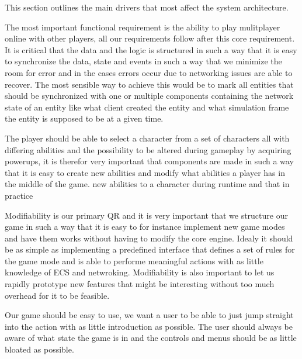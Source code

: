 	This section outlines the main drivers that most affect the system architecture.

	The most important functional requirement is the ability to play mulitplayer online with other	players, all our requirements follow after this core requirement. It is critical that the data and the logic is structured in such a way that it is easy to synchronize the data, state and events in such a way that we minimize the room for error	and in the cases errors occur due to networking issues are able to recover. The most sensible way to achieve this would be to mark all entities 	that should be synchronized with one or multiple components containing the network state of an entity like what client created the entity and what simulation	frame the entity is supposed to be at a given time.

	The player should be able to select a character from a set of characters all with differing abilities and the possibility to be altered during gameplay by acquiring powerups, it is therefor very important that components are made in such a way that it is easy to create new abilities and modify	what abilities a player has in the middle of the game. new abilities to a character during runtime and that in practice

	Modifiability is our primary QR and it is very important that we structure our game in such a way that it is easy to for instance implement new game modes and have them works without having to modify the core engine. Idealy it should be as simple as implementing a predefined interface that defines a set of rules for the game mode and is able to performe meaningful actions with as little knowledge of ECS and netwroking. Modifiability is also important to let us rapidly prototype new features that might be interesting without too much overhead for it to be feasible.

	Our game should be easy to use, we want a user to be able to just jump straight into the action with as little introduction as possible. The user should always be aware of what state the game is in and the controls and menus should be as little bloated as possible.

